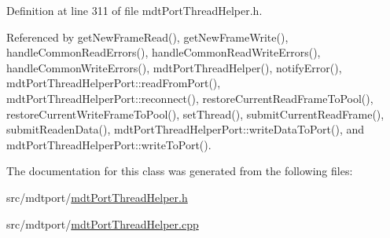 Definition at line 311 of file mdt\-Port\-Thread\-Helper.\-h.



Referenced by get\-New\-Frame\-Read(), get\-New\-Frame\-Write(), handle\-Common\-Read\-Errors(), handle\-Common\-Read\-Write\-Errors(), handle\-Common\-Write\-Errors(), mdt\-Port\-Thread\-Helper(), notify\-Error(), mdt\-Port\-Thread\-Helper\-Port\-::read\-From\-Port(), mdt\-Port\-Thread\-Helper\-Port\-::reconnect(), restore\-Current\-Read\-Frame\-To\-Pool(), restore\-Current\-Write\-Frame\-To\-Pool(), set\-Thread(), submit\-Current\-Read\-Frame(), submit\-Readen\-Data(), mdt\-Port\-Thread\-Helper\-Port\-::write\-Data\-To\-Port(), and mdt\-Port\-Thread\-Helper\-Port\-::write\-To\-Port().



The documentation for this class was generated from the following files\-:\begin{DoxyCompactItemize}
\item 
src/mdtport/\hyperlink{mdt_port_thread_helper_8h}{mdt\-Port\-Thread\-Helper.\-h}\item 
src/mdtport/\hyperlink{mdt_port_thread_helper_8cpp}{mdt\-Port\-Thread\-Helper.\-cpp}\end{DoxyCompactItemize}
